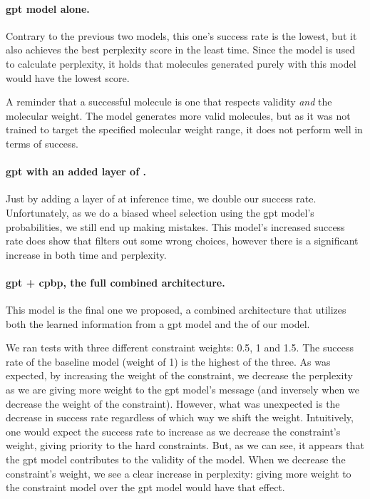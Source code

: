 \documentclass[../Document.tex]{subfiles}
\begin{document}
\paragraph{\gls{gpt} model alone.}
Contrary to the previous two models, this one's success rate is the lowest, but it also achieves the best perplexity score in the least time.
Since the model is used to calculate perplexity, it holds that molecules generated purely with this model would have the lowest score.

A reminder that a successful molecule is one that respects validity \emph{and} the molecular weight. The model generates more valid molecules, but as it was not trained to target the specified molecular weight range, it does not perform well in terms of success.

\paragraph{\gls{gpt} with an added layer of \cp.}
Just by adding a layer of \cp at inference time, we double our success rate.
Unfortunately, as we do a biased wheel selection using the \gls{gpt} model's probabilities, we still end up making mistakes.
This model's increased success rate does show that \cp filters out some wrong choices, however there is a significant increase in both time and perplexity.

\paragraph{\gls{gpt} + \gls{cpbp}, the full combined architecture.}
This model is the final one we proposed, a combined architecture that utilizes both the learned information from a \gls{gpt} model and the \bp of our \cp model.

We ran tests with three different \oracle constraint weights: 0.5, 1 and 1.5.
The success rate of the baseline model (weight of 1) is the highest of the three. 
As was expected, by increasing the weight of the constraint, we decrease the perplexity as we are giving more weight to the \gls{gpt} model's message (and inversely when we decrease the weight of the constraint).
However, what was unexpected is the decrease in success rate regardless of which way we shift the weight.
Intuitively, one would expect the success rate to increase as we decrease the \oracle constraint's weight, giving priority to the hard constraints.
But, as we can see, it appears that the \gls{gpt} model contributes to the validity of the model.
When we decrease the constraint's weight, we see a clear increase in perplexity: giving more weight to the constraint model over the \gls{gpt} model would have that effect.
\end{document}
